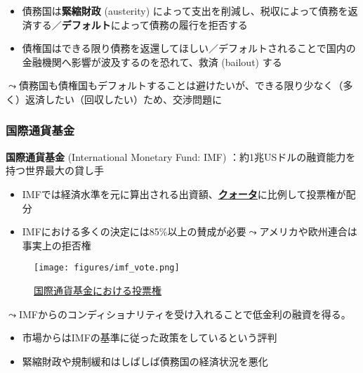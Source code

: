 \documentclass[
  xelatex,
  ja=standard]{bxjsarticle}
\providecommand{\tightlist}{%
  \setlength{\itemsep}{0pt}\setlength{\parskip}{0pt}}\usepackage{longtable,booktabs,array}
\begin{document}
\begin{itemize}
\tightlist
\item
  債務国は\textbf{緊縮財政} (austerity)
  によって支出を削減し、税収によって債務を返済する／\textbf{デフォルト}によって債務の履行を拒否する
\item
  債権国はできる限り債務を返還してほしい／デフォルトされることで国内の金融機関へ影響が波及するのを恐れて、救済
  (bailout) する
\end{itemize}

\(\leadsto\)債務国も債権国もデフォルトすることは避けたいが、できる限り少なく（多く）返済したい（回収したい）ため、交渉問題に

\hypertarget{ux56fdux969bux901aux8ca8ux57faux91d1}{%
\subsubsection{国際通貨基金}\label{ux56fdux969bux901aux8ca8ux57faux91d1}}

\textbf{国際通貨基金} (International Monetary Fund: IMF)
：約1兆USドルの融資能力を持つ世界最大の貸し手

\begin{itemize}
\tightlist
\item
  IMFでは経済水準を元に算出される出資額、\href{https://www.mof.go.jp/policy/international_policy/imf/gaiyou.htm}{\textbf{クォータ}}に比例して投票権が配分
\item
  IMFにおける多くの決定には85\%以上の賛成が必要\(\leadsto\)アメリカや欧州連合は事実上の拒否権
\end{itemize}

\begin{figure}[htpb]

{\centering \texttt{[image: figures/imf\_vote.png]}

}

\caption{\href{https://www.bloomberg.co.jp/news/articles/2021-10-11/R0U4IBDWLU6A01}{国際通貨基金における投票権}}

\end{figure}

\(\leadsto\)IMFからのコンディショナリティを受け入れることで低金利の融資を得る。

\begin{itemize}
\tightlist
\item
  市場からはIMFの基準に従った政策をしているという評判
\item
  緊縮財政や規制緩和はしばしば債務国の経済状況を悪化
\end{itemize}
\end{document}
